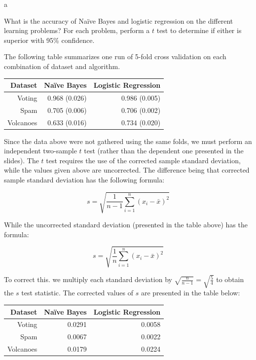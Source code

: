 \documentclass[fleqn]{homework}
\begin{document}
  \begin{problem}{a}
    \begin{question}
      What is the accuracy of Na\"ive Bayes and logistic regression on the
      different learning problems?  For each problem, perform a $t$ test to
      determine if either is superior with 95\% confidence.
    \end{question}

    The following table summarizes one run of 5-fold cross validation on each
    combination of dataset and algorithm.

    \vspace{0.3cm}
    \begin{tabular}{rrr}
      \hline
      Dataset & Na\"ive Bayes & Logistic Regression \\
      \hline
      Voting & 0.968 (0.026) & 0.986 (0.005) \\
      Spam & 0.705 (0.006) & 0.706 (0.002) \\
      Volcanoes & 0.633 (0.016) & 0.734 (0.020) \\
      \hline
    \end{tabular}
    \vspace{0.3cm}

    Since the data above were not gathered using the same folds, we must perform
    an independent two-sample $t$ test (rather than the dependent one presented
    in the slides).  The $t$ test requires the use of the corrected sample
    standard deviation, while the values given above are uncorrected.  The
    difference being that corrected sample standard deviation has the following
    formula:

    \begin{equation}
      s = \sqrt{\frac{1}{n-1} \sum_{i=1}^n (x_i - \bar{x})^2}
    \end{equation}

    While the uncorrected standard deviation (presented in the table above) has
    the formula:

    \begin{equation}
      s = \sqrt{\frac{1}{n} \sum_{i=1}^n (x_i - \bar{x})^2}
    \end{equation}

    To correct this. we multiply each standard deviation by
    $\sqrt{\frac{n}{n-1}} = \sqrt{\frac{5}{4}}$ to obtain the $s$ test
    statistic.  The corrected values of $s$ are presented in the table below:

    \vspace{0.3cm}
    \begin{tabular}{rrr}
      \hline
      Dataset & Na\"ive Bayes & Logistic Regression \\
      \hline
      Voting & 0.0291 & 0.0058 \\
      Spam & 0.0067 & 0.0022 \\
      Volcanoes & 0.0179 & 0.0224 \\
      \hline
    \end{tabular}
    \vspace{0.3cm}


\end{problem}
\end{document}
